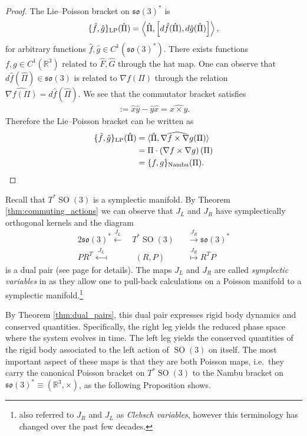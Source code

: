 \documentclass[12pt]{amsart}
\newcommand{\so}{\ensuremath{\mathfrak{so}}}
\DeclareMathOperator{\SO}{SO}
\begin{document}
  \begin{proof}
    The Lie--Poisson bracket on $\so(3)^*$ is
    \begin{align*}
      \{ \hat{f} , \hat{g} \}_{\rm LP} (\hat{\Pi}) =
      \left \langle \hat{\Pi} , \left[ d\hat{f}(\hat{\Pi}) , d\hat{g}(\hat{\Pi}) \right]
        \right \rangle,
    \end{align*}
    for arbitrary functions $\hat{f},\hat{g} \in C^1(\so(3)^*)$.
    There exists functions $f,g \in C^1(\mathbb{R}^3)$ related to $\hat{F},\hat{G}$ through the hat map.
    One can observe that $d\hat{f}(\hat{\Pi}) \in \so(3)$ is 
    related to $\nabla f(\Pi)$ through the relation $\widehat{ \nabla f(\Pi)} = d\hat{f}( \hat{\Pi})$.
    We see that the commutator bracket satisfies
    \begin{align*}
      [\hat{x},\hat{y} ] := \hat{x} \hat{y} - \hat{y} \hat{x} = \widehat{x \times y }.
    \end{align*}
    Therefore the Lie--Poisson bracket can be written as
    \begin{align*}
    \{ \hat{f} , \hat{g} \}_{\rm LP}(\hat{\Pi})
    &= \langle \hat{\Pi} , \widehat{ \nabla f \times \nabla g }(\Pi) \rangle \\
    &= \Pi \cdot  \left( \nabla f \times \nabla g \right)(\Pi) \\
    &= \{ f , g \}_{\rm Nambu}(\Pi).
    \end{align*}
  \end{proof}

  Recall that $T^*\SO(3)$ is a symplectic manifold.
  By Theorem \ref{thm:commuting_actions}
  we can observe that $J_L$ and $J_R$ have symplectically
  orthogonal kernels and the diagram
  \begin{alignat*}{2}
    \so(3)^* \stackrel{J_L}{\longleftarrow}&
    \,T^* \SO(3)
    &&\stackrel{J_R}{\longrightarrow} \so(3)^* \\
     PR^T \stackrel{J_L}{\longmapsfrom}&
    \;\; (R,P)
    &&\stackrel{J_R}{\longmapsto} R^TP
  \end{alignat*}
  is a dual pair
  (see page \pageref{thm:dual_pairs} for details).
  The maps $J_L$ and $J_R$ are called \emph{symplectic variables} in \cite{MarsdenWeinstein1983}
  as they allow one to pull-back calculations on a Poisson manifold to a symplectic manifold.\footnote{
  	\cite{MarsdenWeinstein1983} also referred to $J_R$ and $J_L$ as \emph{Clebsch variables},
		however this terminology has changed over the past few decades.}

  By Theorem \ref{thm:dual_pairs}, this dual pair expresses rigid
  body dynamics and conserved quantities.
  Specifically, the right leg yields the reduced phase space where 
  the system evolves in time.
  The left leg yields the conserved quantities of the rigid body
  associated to the left action of $\SO(3)$ on itself.
  The most important aspect of these maps is that they are both Poisson
  maps, i.e.\ they carry the canonical Poisson bracket on $T^* \SO(3)$
  to the Nambu bracket on $\so(3)^* \equiv (\mathbb{R}^3,\times)$,
  as the following Proposition shows.
\end{document}
